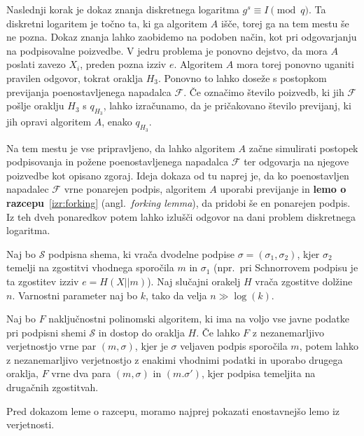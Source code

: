 \documentclass[isrm2, tisk]{fmfdelo}
\begin{document}
Naslednji korak je dokaz znanja diskretnega logaritma $g^s \equiv I \pmod q$. Ta diskretni logaritem
je točno ta, ki ga algoritem $A$ išče, torej ga na tem mestu še ne pozna. Dokaz znanja lahko zaobidemo
na podoben način, kot pri odgovarjanju na podpisovalne poizvedbe. V jedru problema je ponovno dejstvo,
da mora $A$ poslati zavezo $X_i$, preden pozna izziv $e$. Algoritem $A$ mora torej ponovno uganiti
pravilen odgovor, tokrat oraklja $H_3$. Ponovno to lahko doseže s postopkom previjanja poenostavljenega
napadalca $\mathcal{F}$. Če označimo število poizvedb, ki jih $\mathcal{F}$ pošlje oraklju $H_3$ s
$q_{H_3}$, lahko izračunamo, da je pričakovano število previjanj, ki jih opravi algoritem $A$,
enako $q_{H_3}$.

Na tem mestu je vse pripravljeno, da lahko algoritem $A$ začne simulirati postopek podpisovanja in
požene poenostavljenega napadalca $\mathcal{F}$ ter odgovarja na njegove poizvedbe kot opisano zgoraj.
Ideja dokaza od tu naprej je, da ko poenostavljen napadalec $\mathcal{F}$ vrne ponarejen podpis,
algoritem $A$ uporabi previjanje in \textbf{lemo o razcepu}~\ref{izr:forking} (angl.\
\textit{forking lemma}), da pridobi še en ponarejen podpis. Iz teh dveh ponaredkov potem lahko
izlušči odgovor na dani problem diskretnega logaritma.

\begin{izrek}
\label{izr:forking}
    Naj bo $\mathcal{S}$ podpisna shema, ki vrača dvodelne podpise $\sigma = (\sigma_1, \sigma_2)$,
    kjer $\sigma_2$ temelji na zgostitvi vhodnega sporočila $m$ in $\sigma_1$ (npr.\ pri Schnorrovem 
    podpisu je ta zgostitev izziv  $e = H(X || m)$). Naj slučajni orakelj $H$ vrača zgostitve
    dolžine $n$. Varnostni parameter naj bo $k$, tako da velja $n \gg \log(k)$.

    Naj bo $F$ naključnostni polinomski algoritem, ki ima na voljo vse javne podatke pri podpisni
    shemi $\mathcal{S}$ in dostop do oraklja $H$. Če lahko $F$ z nezanemarljivo verjetnostjo vrne par
    $(m, \sigma)$, kjer je $\sigma$  veljaven podpis sporočila $m$, potem lahko z nezanemarljivo
    verjetnostjo z enakimi vhodnimi podatki in uporabo drugega oraklja, $F$ vrne dva para
    $(m, \sigma)$ in $(m. \sigma')$, kjer podpisa temeljita na drugačnih zgostitvah.
\end{izrek}

Pred dokazom leme o razcepu, moramo najprej pokazati enostavnejšo lemo iz verjetnosti.
\end{document}
